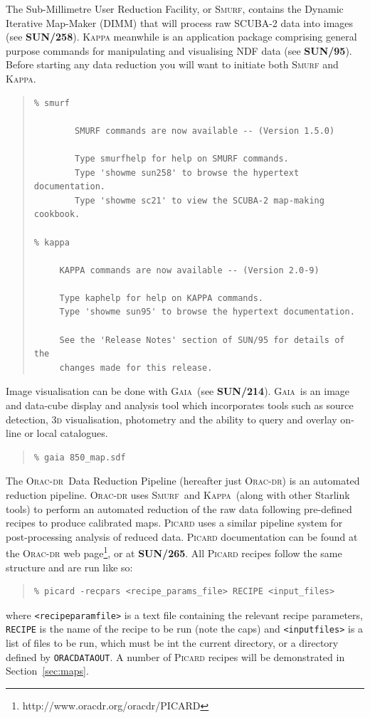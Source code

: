 \documentclass[twoside,11pt]{article}
\newcommand{\htmladdnormallinkfoot}[2]{#1\footnote{#2}}
\newcommand{\htmladdnormallink}[2]{#1}
\newcommand{\htmlref}[2]{#1}
\newcommand{\latexhtml}[2]{#1}
\newcommand{\xref}[3]{#1}
\renewcommand{\_}{\texttt{\symbol{95}}}
\newenvironment{myquote}{\begin{quote}\begin{small}}{\end{small}\end{quote}}
\newcommand{\gaia}{\xref{\textsc{Gaia}}{sun214}{}}
\newcommand{\Kappa}{\xref{\textsc{Kappa}}{sun95}{}}
\newcommand{\oracdr}{\htmladdnormallink{\textsc{Orac-dr}}{http://www.oracdr.org/oracdr}}
\newcommand{\smurf}{\xref{\textsc{Smurf}}{sun258}{}}
\newcommand{\param}[1]{\texttt{#1}}
\newcommand{\gaiasun}{\xref{\textbf{SUN/214}}{sun214}{}}
\newcommand{\kappasun}{\xref{\textbf{SUN/95}}{sun95}{}}
\newcommand{\picardsun}{\xref{\textbf{SUN/265}}{sun265}{}}
\newcommand{\smurfsun}{\xref{\textbf{SUN/258}}{sun258}{}}
\newcommand{\cref}[3]{\latexhtml{#1~\ref{#2}}{\htmlref{#3}{#2}}}
\begin{document}
The Sub-Millimetre User Reduction Facility, or \textsc{Smurf}, contains the
Dynamic Iterative Map-Maker (DIMM) that will process raw SCUBA-2 data
into images (see \smurfsun). \textsc{Kappa} meanwhile is an application
package comprising general purpose commands for manipulating and
visualising NDF data (see \kappasun). Before starting any data
reduction you will want to initiate both \textsc{Smurf} and \textsc{Kappa}.
\begin{myquote}
\begin{verbatim}
% smurf

        SMURF commands are now available -- (Version 1.5.0)

        Type smurfhelp for help on SMURF commands.
        Type 'showme sun258' to browse the hypertext documentation.
        Type 'showme sc21' to view the SCUBA-2 map-making cookbook.

% kappa

     KAPPA commands are now available -- (Version 2.0-9)

     Type kaphelp for help on KAPPA commands.
     Type 'showme sun95' to browse the hypertext documentation.

     See the 'Release Notes' section of SUN/95 for details of the
     changes made for this release.
\end{verbatim}
\end{myquote}
Image visualisation can be done with \gaia\ (see \gaiasun). \gaia\ is an
image and data-cube display and analysis tool which incorporates tools such
as source detection, 3\textsc{d} visualisation, photometry and the ability
to query and overlay on-line or local catalogues.
\begin{myquote}
\begin{verbatim}
% gaia 850_map.sdf
\end{verbatim}
\end{myquote}

The \oracdr\ Data Reduction Pipeline \cite{oracdr} (hereafter just
\textsc{Orac-dr}) is an automated reduction pipeline. \textsc{Orac-dr} uses
\smurf\ and \Kappa\ (along with other Starlink tools) to perform an automated
reduction of the raw data following pre-defined recipes to produce
calibrated maps. \textsc{Picard} uses a similar pipeline system for
post-processing analysis of reduced data. \textsc{Picard}
documentation can be found at \htmladdnormallinkfoot{the \textsc{Orac-dr} web
page}{http://www.oracdr.org/oracdr/PICARD}, or at \picardsun. All
\textsc{Picard} recipes follow the same structure and are run like so:
\begin{myquote}
\begin{verbatim}
% picard -recpars <recipe_params_file> RECIPE <input_files>
\end{verbatim}
\end{myquote}
where \param{<recipe\_param\_file>} is a text file containing the
relevant recipe parameters, \param{RECIPE} is the name of the recipe
to be run (note the caps) and \param{<input\_files>} is a list of
files to be run, which must be int the current directory, or a
directory defined by \param{ORAC\_DATA\_OUT}. A number of \textsc{Picard}
recipes will be demonstrated in \cref{Section}{sec:maps}{Reducing your data}.
\end{document}
